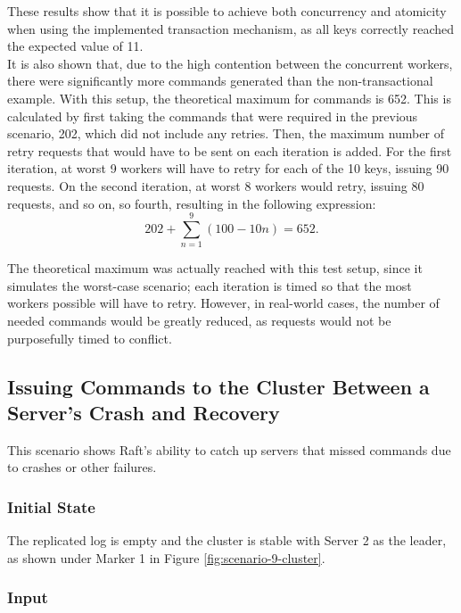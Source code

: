 These results show that it is possible to achieve both concurrency and atomicity when using the implemented transaction mechanism, as all keys correctly reached the expected value of 11.\\

It is also shown that, due to the high contention between the concurrent workers, there were significantly more commands generated than the non-transactional example. With this setup, the theoretical maximum for commands is 652. This is calculated by first taking the commands that were required in the previous scenario, 202, which did not include any retries. Then, the maximum number of retry requests that would have to be sent on each iteration is added. For the first iteration, at worst 9 workers will have to retry for each of the 10 keys, issuing 90 requests. On the second iteration, at worst 8 workers would retry, issuing 80 requests, and so on, so fourth, resulting in the following expression:
\begin{equation}
202 + \sum_{n=1}^{9} ({100-10n}) = 652.
\end{equation}

The theoretical maximum was actually reached with this test setup, since it simulates the worst-case scenario; each iteration is timed so that the most workers possible will have to retry. However, in real-world cases, the number of needed commands would be greatly reduced, as requests would not be purposefully timed to conflict.

\subsection{Issuing Commands to the Cluster Between a Server's Crash and Recovery}

This scenario shows Raft's ability to catch up servers that missed commands due to crashes or other failures.

\subsubsection{Initial State}

The replicated log is empty and the cluster is stable with Server 2 as the leader, as shown under Marker 1 in Figure \ref{fig:scenario-9-cluster}.

\subsubsection{Input}

